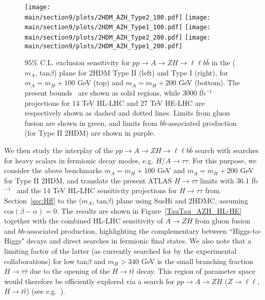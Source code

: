 \begin{figure}[h]
\begin{center}
\texttt{[image: \\main/section9/plots/2HDM\_AZH\_Type2\_100.pdf]}
\hspace{3mm}
\texttt{[image: \\main/section9/plots/2HDM\_AZH\_Type1\_100.pdf]}
\texttt{[image: \\main/section9/plots/2HDM\_AZH\_Type2\_200.pdf]}
\hspace{3mm}
\texttt{[image: \\main/section9/plots/2HDM\_AZH\_Type1\_200.pdf]}
\caption{\small $95\%$ C.L. exclusion sensitivity for $p p \to A \to Z H \to \ell\ell b \bar{b}$  
in the ($m_{A}$, tan$\beta$) plane for 2HDM Type II (left) and Type I (right), for $m_A = m_H +100$ GeV (top) and $m_A = m_H +200$ GeV (bottom). The present bounds~\cite{Aaboud:2018eoy} are shown as solid regions, while
$3000$ fb$^{-1}$ projections for 14 TeV HL-LHC and 27 TeV HE-LHC are respectively shown as dashed and dotted lines. Limits from gluon fusion are shown in green, and limits from $bb$-associated production (for Type II 2HDM) are shown in purple.}
\label{AZH_HL-LHC}
\end{center}
\end{figure}


We then study the interplay of the $p p \to A \to Z H \to \ell\ell b \bar{b}$ search with searches for heavy scalars in fermionic decay modes, e.g. $H/A \to \tau\tau$. For this purpose, we consider 
the above benchmarks $m_A = m_H + 100$ GeV and $m_A = m_H + 200$ GeV for Type II 2HDM, and translate the present ATLAS $H \to \tau\tau$ limits with $36.1$ fb$^{-1}$~\cite{Aaboud:2017sjh} and the 14 TeV HL-LHC sensitivity projections for $H \to \tau\tau$ from Section~\ref{sec:Hff} to the ($m_{A}$, $\mathrm{tan}\beta$) plane using {\sc SusHi} and {\sc 2HDMC}, assuming $\mathrm{cos}(\beta - \alpha) = 0$. The results are shown in Figure~\ref{TauTau_AZH_HL-HE} together with the combined HL-LHC sensitivity of $A \to Z H$ from gluon fusion and $bb$-associated production, highlighting the complementary between ``Higgs-to-Higgs" decays and direct searches in fermionic final states. We also note that a limiting factor of the latter (as currently searched for by the experimental collaborations) for low tan$\beta$ and $m_H > 340$ GeV is the small branching fraction $H \to \tau \bar{\tau}$ due to the opening of the $H \to t \bar{t}$ decay. This region of parameter space would therefore be efficiently explored via a search for $p p \to A \to Z H$ ($Z\to \ell\ell$, $H \to t\bar{t}$) (see e.g.~\cite{Dorsch:2016tab,Haisch:2018djm}).

